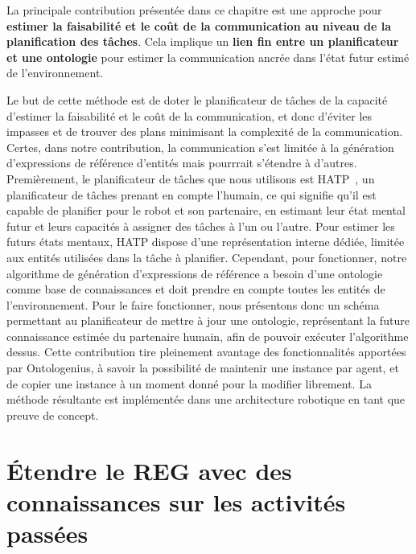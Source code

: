 La principale contribution présentée dans ce chapitre est une approche pour \textbf{estimer la faisabilité et le coût de la communication au niveau de la planification des tâches}. Cela implique un \textbf{lien fin entre un planificateur et une ontologie} pour estimer la communication ancrée dans l'état futur estimé de l'environnement. 

Le but de cette méthode est de doter le planificateur de tâches de la capacité d'estimer la faisabilité et le coût de la communication, et donc d'éviter les impasses et de trouver des plans minimisant la complexité de la communication. Certes, dans notre contribution, la communication s'est limitée à la génération d'expressions de référence d'entités mais pourrrait s'étendre à d'autres. Premièrement, le planificateur de tâches que nous utilisons est HATP~\cite{lallement_2014_hatp}, un planificateur de tâches prenant en compte l'humain, ce qui signifie qu'il est capable de planifier pour le robot et son partenaire, en estimant leur état mental futur et leurs capacités à assigner des tâches à l'un ou l'autre. Pour estimer les futurs états mentaux, HATP dispose d'une représentation interne dédiée, limitée aux entités utilisées dans la tâche à planifier. Cependant, pour fonctionner, notre algorithme de génération d'expressions de référence a besoin d'une ontologie comme base de connaissances et doit prendre en compte toutes les entités de l'environnement. Pour le faire fonctionner, nous présentons donc un schéma permettant au planificateur de mettre à jour une ontologie, représentant la future connaissance estimée du partenaire humain, afin de pouvoir exécuter l'algorithme dessus. Cette contribution tire pleinement avantage des fonctionnalités apportées par Ontologenius, à savoir la possibilité de maintenir une instance par agent, et de copier une instance à un moment donné pour la modifier librement. La méthode résultante est implémentée dans une architecture robotique en tant que preuve de concept. 

\section*{Étendre le REG avec des connaissances sur les activités passées}


